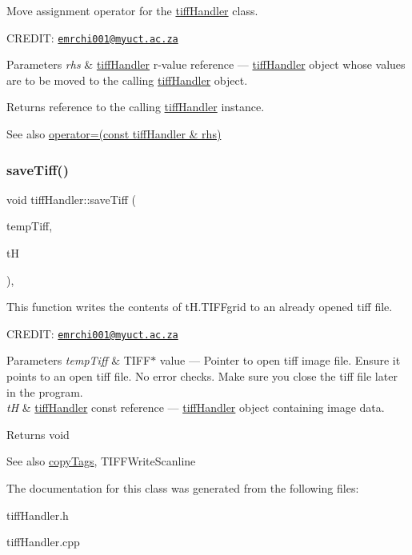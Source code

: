 Move assignment operator for the \hyperlink{classtiffHandler}{tiff\+Handler} class. 

C\+R\+E\+D\+IT\+: \href{mailto:emrchi001@myuct.ac.za}{\tt emrchi001@myuct.\+ac.\+za}


\begin{DoxyParams}{Parameters}
{\em rhs} & \hyperlink{classtiffHandler}{tiff\+Handler} r-\/value reference --- \hyperlink{classtiffHandler}{tiff\+Handler} object whose values are to be moved to the calling \hyperlink{classtiffHandler}{tiff\+Handler} object.\\
\hline
\end{DoxyParams}
\begin{DoxyReturn}{Returns}
reference to the calling \hyperlink{classtiffHandler}{tiff\+Handler} instance.
\end{DoxyReturn}
\begin{DoxySeeAlso}{See also}
\hyperlink{classtiffHandler_aa48648c589647b32caf342d912d3353e}{operator=(const tiff\+Handler \& rhs)} 
\end{DoxySeeAlso}
\mbox{\label{classtiffHandler_a691f65932d0dddc162689603efe9b56b}} 
\subsubsection{\texorpdfstring{save\+Tiff()}{saveTiff()}}
{\footnotesize\ttfamily void tiff\+Handler\+::save\+Tiff (\begin{DoxyParamCaption}\item[{T\+I\+FF $\ast$}]{temp\+Tiff,  }\item[{const \hyperlink{classtiffHandler}{tiff\+Handler} \&}]{tH }\end{DoxyParamCaption})\hspace{0.3cm}{\ttfamily [inline]}, {\ttfamily [protected]}}



This function writes the contents of t\+H.\+T\+I\+F\+Fgrid to an already opened tiff file. 

C\+R\+E\+D\+IT\+: \href{mailto:emrchi001@myuct.ac.za}{\tt emrchi001@myuct.\+ac.\+za}


\begin{DoxyParams}{Parameters}
{\em temp\+Tiff} & T\+I\+F\+F$\ast$ value --- Pointer to open tiff image file. Ensure it points to an open tiff file. No error checks. Make sure you close the tiff file later in the program. \\
\hline
{\em tH} & \hyperlink{classtiffHandler}{tiff\+Handler} const reference --- \hyperlink{classtiffHandler}{tiff\+Handler} object containing image data.\\
\hline
\end{DoxyParams}
\begin{DoxyReturn}{Returns}
void
\end{DoxyReturn}
\begin{DoxySeeAlso}{See also}
\hyperlink{classtiffHandler_a2a813af9ec1e322fafc0d5e0a3593cbc}{copy\+Tags}, T\+I\+F\+F\+Write\+Scanline 
\end{DoxySeeAlso}


The documentation for this class was generated from the following files\+:\begin{DoxyCompactItemize}
\item 
tiff\+Handler.\+h\item 
tiff\+Handler.\+cpp\end{DoxyCompactItemize}
